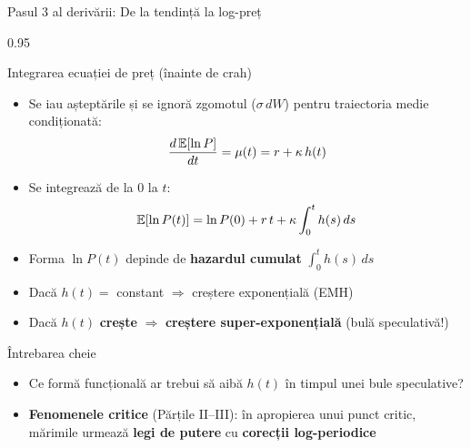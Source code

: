 \documentclass[9pt, aspectratio=169, t]{beamer}
\begin{document}
\begin{frame}{Pasul 3 al derivării: De la tendință la log-preț}
    \begin{cminipage}{0.95\textwidth}
    {\footnotesize
    \begin{block}{Integrarea ecuației de preț (înainte de crah)}
        \begin{itemize}\setlength{\itemsep}{0pt}
            \item Se iau așteptările și se ignoră zgomotul ($\sigma\,dW$) pentru traiectoria medie condiționată:
            \vspace{-2mm}
                $$\frac{d\,\mathbb{E}[\ln P]}{dt} = \mu(t) = r + \kappa\, h(t)$$
            \vspace{-4mm}
            \item Se integrează de la $0$ la $t$:
            \vspace{-2mm}
                $$\mathbb{E}[\ln P(t)] = \ln P(0) + r\,t + \kappa \int_0^t h(s)\,ds$$
            \vspace{-4mm}
            \item Forma $\ln P(t)$ depinde de \textbf{hazardul cumulat} $\int_0^t h(s)\,ds$
            \item Dacă $h(t) = $ constant $\Rightarrow$ creștere exponențială (EMH)
            \item Dacă $h(t)$ \textbf{crește} $\Rightarrow$ \textbf{creștere super-exponențială} (bulă speculativă!)
        \end{itemize}
    \end{block}

    \vspace{-2mm}

    \begin{alertblock}{Întrebarea cheie}
        \begin{itemize}\setlength{\itemsep}{0pt}
            \item Ce formă funcțională ar trebui să aibă $h(t)$ în timpul unei bule speculative?
            \item \textbf{Fenomenele critice} (Părțile II--III): în apropierea unui punct critic, mărimile urmează \textbf{legi de putere} cu \textbf{corecții log-periodice}
        \end{itemize}
    \end{alertblock}
    }
    \end{cminipage}
\end{frame}
\end{document}
